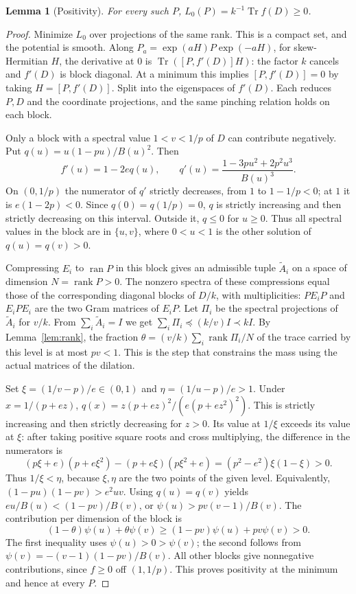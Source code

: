 \documentclass[11pt]{article}
\newtheorem{lemma}{Lemma}[section]
\newcommand{\Tr}{\operatorname{Tr}}
\newcommand{\rank}{\operatorname{rank}}
\newcommand{\ran}{\operatorname{ran}}
\begin{document}
\begin{lemma}[Positivity]\label{lem:potential}
For every such \(P\), \(L_0(P)=k^{-1}\Tr f(D)\ge0\).
\end{lemma}

\begin{proof}
Minimize \(L_0\) over projections of the same rank. This is a
compact set, and the potential is smooth. Along
\(P_a=\exp(aH)P\exp(-aH)\), for skew-Hermitian \(H\),
the derivative at \(0\) is \(\Tr([P,f'(D)]H)\): the factor \(k\)
cancels and \(f'(D)\) is block diagonal. At a minimum this implies
\([P,f'(D)]=0\) by taking \(H=[P,f'(D)]\).
Split into the eigenspaces of \(f'(D)\). Each reduces \(P,D\)
and the coordinate projections, and the same pinching relation
holds on each block.

Only a block with a spectral value \(1<v<1/p\) of \(D\) can
contribute negatively. Put \(q(u)=u(1-pu)/B(u)^2\). Then
\begin{equation}\label{eq:qprime}
 f'(u)=1-2e q(u),\qquad q'(u)=\frac{1-3pu^2+2p^2u^3}{B(u)^3}.
\end{equation}
On \((0,1/p)\) the numerator of \(q'\) strictly decreases, from
\(1\) to \(1-1/p<0\); at \(1\) it is \(e(1-2p)<0\).
Since \(q(0)=q(1/p)=0\), \(q\) is strictly increasing and then strictly
decreasing on this interval. Outside it, \(q\le0\) for \(u\ge0\).
Thus all spectral values in the block are in \(\{u,v\}\), where
\(0<u<1\) is the other solution of \(q(u)=q(v)>0\).

Compressing \(E_i\) to \(\ran P\) in this block gives an admissible
tuple \(\widetilde A_i\) on a space of dimension \(N=\rank P>0\).
The nonzero spectra of these compressions equal those of the
corresponding diagonal blocks of \(D/k\), with multiplicities:
\(PE_iP\) and \(E_iPE_i\) are the two Gram matrices of \(E_iP\).
Let \(\Pi_i\) be the spectral projections of \(\widetilde A_i\)
for \(v/k\). From \(\sum_i\widetilde A_i=I\) we get
\(\sum_i\Pi_i\preceq (k/v)I\prec kI\).
By Lemma~\ref{lem:rank}, the fraction
\(\theta=(v/k)\sum_i\rank\Pi_i/N\) of the trace carried by this
level is at most \(pv<1\). This is the step that constrains the
mass using the actual matrices of the dilation.

Set \(\xi=(1/v-p)/e\in(0,1)\) and \(\eta=(1/u-p)/e>1\).
Under \(x=1/(p+ez)\), \(q(x)=z(p+ez)^2/(e(p+ez^2)^2)\).
This is strictly increasing and then strictly decreasing for \(z>0\).
Its value at \(1/\xi\) exceeds its value at \(\xi\): after taking
positive square roots and cross multiplying, the difference in the
numerators is
\[
(p\xi+e)(p+e\xi^2)-(p+e\xi)(p\xi^2+e)
=(p^2-e^2)\xi(1-\xi)>0.
\]
Thus \(1/\xi<\eta\), because \(\xi,\eta\) are the two points of
the given level. Equivalently, \((1-pu)(1-pv)>e^2uv\).
Using \(q(u)=q(v)\) yields
\(eu/B(u)<(1-pv)/B(v)\), or
\(\psi(u)>pv(v-1)/B(v)\). The contribution per dimension of the block is
\[
(1-\theta)\psi(u)+\theta\psi(v)
\ge (1-pv)\psi(u)+pv\psi(v)>0.
\]
The first inequality uses \(\psi(u)>0>\psi(v)\); the second follows
from \(\psi(v)=-(v-1)(1-pv)/B(v)\). All other blocks give
nonnegative contributions, since \(f\ge0\) off \((1,1/p)\).
This proves positivity at the minimum and hence at every \(P\).
\end{proof}
\end{document}

